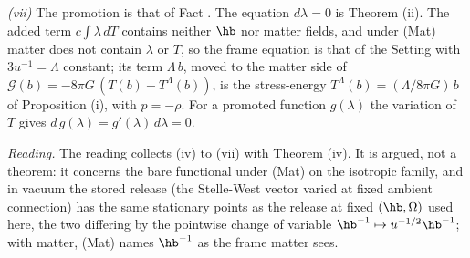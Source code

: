 \emph{(vii)} The promotion is that of Fact . The equation $d\lambda = 0$ is Theorem (ii). The added term $c\int\lambda\,dT$ contains neither $\hb$ nor matter fields, and under (Mat) matter does not contain $\lambda$ or $T$, so the frame equation is that of the Setting with $3u^{-1} = \Lambda$ constant; its term $\Lambda\,b$, moved to the matter side of $\mathcal{G}(b) = -8\pi G\,(T(b) + T^{\Lambda}(b))$, is the stress-energy $T^{\Lambda}(b) = (\Lambda/8\pi G)\,b$ of Proposition (i), with $p = -\rho$. For a promoted function $g(\lambda)$ the variation of $T$ gives $d\,g(\lambda) = g'(\lambda)\,d\lambda = 0$.

\emph{Reading.} The reading collects (iv) to (vii) with Theorem (iv). It is argued, not a theorem: it concerns the bare functional under (Mat) on the isotropic family, and in vacuum the stored release (the Stelle-West vector varied at fixed ambient connection) has the same stationary points as the release at fixed $(\hb, \Omega)$ used here, the two differing by the pointwise change of variable $\hb^{-1} \mapsto u^{-1/2}\hb^{-1}$; with matter, (Mat) names $\hb^{-1}$ as the frame matter sees.
